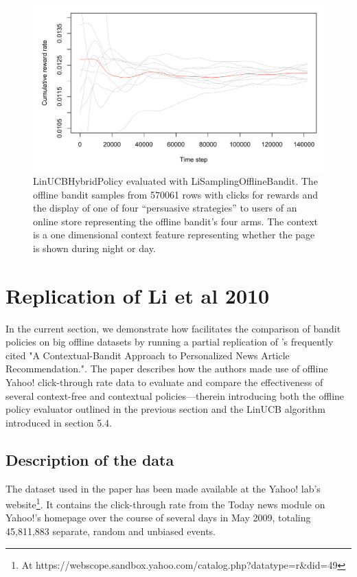 \documentclass{jss}
\begin{document}
\begin{figure}[H]
  \centering
    \includegraphics[width=.99\textwidth]{fig/offline_bandit}

      \caption{LinUCBHybridPolicy evaluated with LiSamplingOfflineBandit. The offline bandit samples from 570061 rows with clicks for rewards and the display of one of four “persuasive strategies” to users of an online store representing the offline bandit's four arms. The context is a one dimensional context feature representing whether the page is shown during night or day. }
      \label{fig:offline_bandit}
\end{figure}

\section{Replication of Li et al 2010} \label{repl}

In the current section, we demonstrate how  facilitates the comparison of bandit policies on big offline datasets by running a partial replication of \cite{Li2010}'s frequently cited "A Contextual-Bandit Approach to Personalized News Article Recommendation.". The paper describes how the authors made use of offline Yahoo! click-through rate data to evaluate and compare the effectiveness of several context-free and contextual policies---therein introducing both the offline policy evaluator outlined in the previous section and the LinUCB algorithm introduced in section 5.4.

\subsection{Description of the data} \label{datadesc}

The dataset used in the \cite{Li2010} paper has been made available at the Yahoo! lab's website\footnote{At https://webscope.sandbox.yahoo.com/catalog.php?datatype=r\&did=49}. It contains the click-through rate from the Today news module on Yahoo!'s homepage over the course of several days in May 2009, totaling 45,811,883 separate, random and unbiased events.
\end{document}
